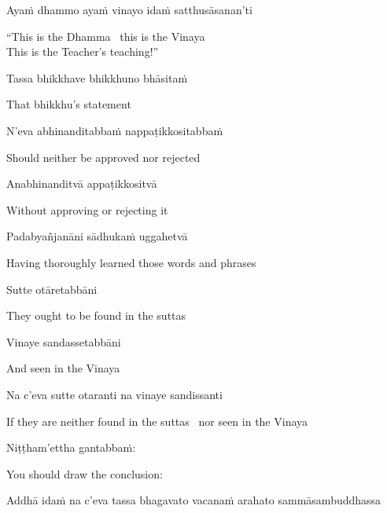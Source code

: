 Ayaṁ dhammo ayaṁ vinayo idaṁ satthusāsanan'ti

\begin{english}
  ``This is the Dhamma \breathmark\ this is the Vinaya\\
  This is the Teacher's teaching!''
\end{english}

Tassa bhikkhave bhikkhuno bhāsitaṁ

\begin{english}
  That bhikkhu's statement
\end{english}

N'eva abhinanditabbaṁ nappaṭikkositabbaṁ

\begin{english}
  Should neither be approved nor rejected
\end{english}

Anabhinanditvā appaṭikkositvā

\begin{english}
  Without approving or rejecting it
\end{english}

Padabyañjanāni sādhukaṁ uggahetvā

\begin{english}
  Having thoroughly learned those words and phrases
\end{english}

Sutte otāretabbāni

\begin{english}
  They ought to be found in the suttas
\end{english}

Vinaye sandassetabbāni

\begin{english}
  And seen in the Vinaya
\end{english}

Na c'eva sutte otaranti na vinaye sandissanti

\begin{english}
  If they are neither found in the suttas \breathmark\ nor seen in the Vinaya
\end{english}

Niṭṭham'ettha gantabbaṁ:

\begin{english}
  You should draw the conclusion:
\end{english}

\begin{pali-hang}
  Addhā idaṁ na c'eva tassa bhagavato vacanaṁ arahato sammāsambuddhassa
\end{pali-hang}

